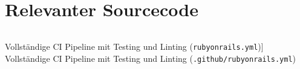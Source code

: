 
\chapter{Relevanter Sourcecode}
\label{Relevanter_Sourcecode}

\begin{listing}[!ht]
\inputminted[linenos]{yaml}{Listings/rubyonrails.yml}

\caption
    [Vollständige CI Pipeline mit Testing und Linting (\texttt{rubyonrails.yml})]
    {Vollständige CI Pipeline mit Testing und Linting (\texttt{.github/rubyonrails.yml})}
\label{lst:pipeline}
\end{listing}